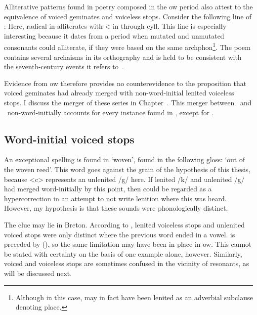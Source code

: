 Alliterative patterns found in poetry composed in the \gls{ow} period also attest to the equivalence of voiced geminates and voiceless stops. Consider the following line of :
Here, radical  in  alliterates with  <  in  through \gls{cyfl}. This line is especially interesting because it dates from a period when mutated and unmutated consonants could alliterate, if they were based on the same \gls{archphon}\footnote{Although in this case,  may in fact have been lenited as an adverbial subclause denoting place.}. The poem contains several archaisms in its orthography and is held to be consistent with the seventh-century events it refers to~\autocite[186--187]{koch_cunedda_2013}.

Evidence from \gls{ow} therefore provides no counterevidence to the proposition that voiced geminates had already merged with non-word-initial lenited voiceless stops. 
I discuss the merger of these series in Chapter~.
This merger between \lT\ and \xD\ non-word-initially accounts for every instance found in , except for .



\subsection{Word-initial voiced stops}
An exceptional spelling is found in  `woven', found in  the following gloss:  `out of the woven reed'. This word goes against the grain of the hypothesis of this thesis, because <c> represents an unlenited /g/ here. If lenited /k/ and unlenited /g/ had merged word-initially by this point, then  could be regarded as a hypercorrection in an attempt to not write lenition where this was heard. However, my hypothesis is that these sounds were phonologically distinct. 

The clue may lie in Breton. According to \textcite[64]{falchun_systeme_1951}, lenited voiceless stops and unlenited voiced stops were only distinct where the previous word ended in a vowel.  is preceded by  (), so the same limitation may have been in place in \Gls{ow}. This cannot be stated with certainty on the basis of one example alone, however. Similarly, voiced and voiceless stops are sometimes confused in the vicinity of resonants, as will be discussed next. 

